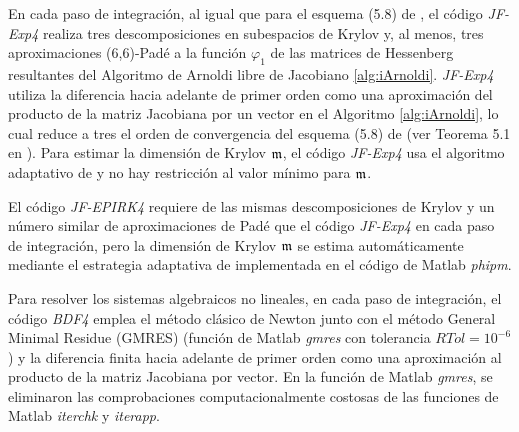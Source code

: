 En cada paso de integración, al igual que para el esquema (5.8) de \cite{hochbruck1998exponential}, el código \textit{JF-Exp4} realiza tres descomposiciones en subespacios de Krylov y, al menos, tres aproximaciones (6,6)-Padé a la función $\varphi_1$ de las matrices de Hessenberg resultantes del Algoritmo de Arnoldi libre de Jacobiano \ref{alg:iArnoldi}. \textit{JF-Exp4} utiliza la diferencia hacia adelante de primer orden como una aproximación del producto de la matriz Jacobiana por un vector en el Algoritmo \ref{alg:iArnoldi}, lo cual reduce a tres el orden de convergencia del esquema (5.8) de \cite{hochbruck1998exponential} (ver Teorema 5.1 en \cite{hochbruck1998exponential}). Para estimar la dimensión de Krylov $\mathfrak{m}$, el código \textit{JF-Exp4} usa el algoritmo adaptativo de \cite{hochbruck1998exponential} y no hay restricción al valor mínimo para $\mathfrak{m}$.

El código \textit{JF-EPIRK4} requiere de las mismas descomposiciones de Krylov y un número similar de aproximaciones de Padé que el código \textit{JF-Exp4} en cada paso de integración, pero la dimensión de Krylov $\mathfrak{m}$ se estima automáticamente mediante el estrategia adaptativa de \cite{niesen2012algorithm} implementada en el código de Matlab \textit{phipm}.

Para resolver los sistemas algebraicos no lineales, en cada paso de integración, el código \textit{BDF4} emplea el método clásico de Newton junto con el método General Minimal Residue (GMRES) (función de Matlab \textit{gmres} con tolerancia $RTol=10^{-6}$) y la diferencia finita hacia adelante de primer orden como una aproximación al producto de la matriz Jacobiana por vector. En la función de Matlab \textit{gmres}, se eliminaron las comprobaciones computacionalmente costosas de las funciones de Matlab \textit{iterchk} y \textit{iterapp}.

